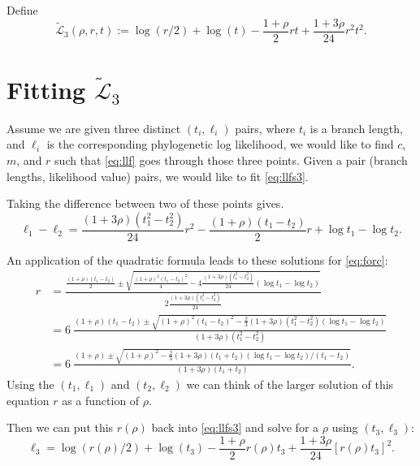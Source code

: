 \documentclass{amsart}
\newcommand{\llf}{\mathcal{L}}   %
\newcommand{\llfs}{\tilde{\llf}}
\newcommand{\loglike}{\ell}           %
\begin{document}
Define
\begin{equation}
  \llfs_3(\rho,r,t) := \log(r/2) + \log(t) - \frac{1+\rho}{2} r t + \frac{1+3 \rho}{24} r^2 t^2.
  \label{eq:llfs3}
\end{equation}

\section{Fitting $\llfs_3$}

Assume we are given three distinct $(t_i, \loglike_i)$ pairs, where $t_i$ is a branch length, and $\loglike_i$ is the corresponding phylogenetic log likelihood, we would like to find $c$, $m$, and $r$ such that \eqref{eq:llf} goes through those three points.
Given a pair (branch lengths, likelihood value) pairs, we would like to fit \eqref{eq:llfs3}.


Taking the difference between two of these points gives.
\begin{equation}
  \loglike_1 - \loglike_2 = \frac{(1+3 \rho)(t_1^2 - t_2^2)}{24} r^2 - \frac{(1+\rho) (t_1 - t_2)}{2} r + \log t_1 - \log t_2.
  \label{eq:forc}
\end{equation}


An application of the quadratic formula leads to these solutions for \eqref{eq:forc}:
\begin{equation}
  \begin{split}
  r & = \frac{\frac{(1+\rho) (t_1 - t_2)}{2} \pm \sqrt{\frac{(1+\rho)^2 (t_1 - t_2)^2}{4} - 4 \frac{(1+3 \rho)(t_1^2 - t_2^2)}{24} (\log t_1 - \log t_2)}}
  {2 \frac{(1+3 \rho)(t_1^2 - t_2^2)}{24}} \\
    & = 6 \ \frac{(1+\rho) (t_1 - t_2) \pm \sqrt{(1+\rho)^2 (t_1 - t_2)^2 - \frac{2}{3} (1+3 \rho)(t_1^2 - t_2^2) (\log t_1 - \log t_2)}}
	  {(1+3 \rho)(t_1^2 - t_2^2)} \\
    & = 6 \ \frac{(1+\rho) \pm \sqrt{(1+\rho)^2 - \frac{2}{3} (1+3 \rho)(t_1 + t_2) (\log t_1 - \log t_2) / (t_1 - t_2)}}
	  {(1+3 \rho)(t_1 + t_2)}.
  \end{split}
  \label{eq:forc}
\end{equation}
Using the $(t_1, \loglike_1)$ and $(t_2, \loglike_2)$ we can think of the larger solution of this equation $r$ as a function of $\rho$.

Then we can put this $r(\rho)$ back into \eqref{eq:llfs3} and solve for a $\rho$ using $(t_3, \loglike_3)$:
\begin{equation}
  \loglike_3 = \log(r(\rho)/2) + \log(t_3) - \frac{1+\rho}{2} r(\rho) t_3 + \frac{1+3 \rho}{24} \left[r(\rho) t_3 \right]^2.
\end{equation}
\end{document}
